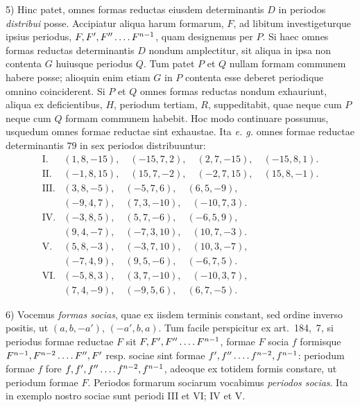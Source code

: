 5) Hinc patet, omnes formas reductas eiusdem determinantis $D$ in periodos \textit{distribui} posse. Accipiatur aliqua harum formarum, $F$, ad libitum investigeturque ipsius periodus, $F,F',F''\mathinner{\ldotp\ldotp\ldotp\ldotp} F^{n-1}$, quam designemus per $P$. Si haec omnes formas reductas determinantis $D$ nondum amplectitur, sit aliqua in ipsa non contenta $G$ huiusque periodus $Q$. Tum patet $P$ et $Q$ nullam formam communem habere posse; alioquin enim etiam $G$ in $P$ contenta esse deberet periodique omnino coinciderent. Si $P$ et $Q$ omnes formas reductas nondum exhauriunt, aliqua ex deficientibus, $H$, periodum tertiam, $R$, suppeditabit, quae neque cum $P$ neque cum $Q$ formam communem habebit. Hoc modo continuare possumus, usquedum omnes formae reductae sint exhaustae. Ita \textit{e. g.} omnes formae reductae determinantis $79$ in sex periodos distribuuntur:
\[
\begin{array}{rl}
\mathrm{I.}&(1,8,-15),\quad (-15,7,2),\quad (2,7,-15),\quad (-15,8,1).\\
\mathrm{II.}&(-1,8,15),\quad (15,7,-2),\quad (-2,7,15),\quad (15,8,-1).\\
\mathrm{III.}&(3,8,-5),\quad (-5,7,6),\quad (6,5,-9),\\
&(-9,4,7),\quad (7,3,-10),\quad (-10,7,3).\\
\mathrm{IV.}&(-3,8,5),\quad (5,7,-6),\quad (-6,5,9),\\
&(9,4,-7),\quad (-7,3,10),\quad (10,7,-3).\\
\mathrm{V.}&(5,8,-3),\quad (-3,7,10),\quad (10,3,-7),\\
&(-7,4,9),\quad (9,5,-6),\quad (-6,7,5).\\
\mathrm{VI.}&(-5,8,3),\quad (3,7,-10),\quad (-10,3,7),\\
&(7,4,-9),\quad (-9,5,6),\quad (6,7,-5).
\end{array}
\]

6) Vocemus \textit{formas socias}, quae ex iisdem terminis constant, sed ordine inverso positis, ut $(a,b,-a')$, $(-a',b,a)$. Tum facile perspicitur ex art.~184,~7, si periodus formae reductae $F$ sit $F,F',F''\mathinner{\ldotp\ldotp\ldotp\ldotp} F^{n-1}$, formae $F$ socia $f$ formisque $F^{n-1},F^{n-2}\mathinner{\ldotp\ldotp\ldotp\ldotp} F'',F'$ resp. sociae sint formae $f',f''\mathinner{\ldotp\ldotp\ldotp\ldotp} f^{n-2},f^{n-1}$: periodum formae $f$ fore $f,f',f''\mathinner{\ldotp\ldotp\ldotp\ldotp} f^{n-2},f^{n-1}$, adeoque ex totidem formis constare, ut periodum formae $F$. Periodos formarum sociarum vocabimus \textit{periodos socias}. Ita in exemplo nostro sociae sunt periodi III et VI; IV et V.

